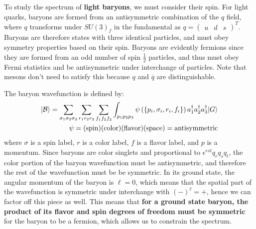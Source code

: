 \documentclass[11pt, oneside]{article}   	%
\theoremstyle{definition}
\numberwithin{equation}{subsection}		%
\begin{document}
To study the spectrum of \textbf{light baryons}, we must consider their spin. For light quarks, baryons are formed from an antisymmetric combination of 
the $q$ field, where $q$ transforms under $SU(3)_f$ in the fundamental as $q = \begin{pmatrix} u & d & s \end{pmatrix}^T$. Baryons are therefore 
states with three identical particles, and must obey symmetry properties based on their spin. Baryons are evidently fermions since they are 
formed from an odd number of spin $\frac{1}{2}$ particles, and thus must obey Fermi statistics and be antisymmetric under interchange of 
particles. Note that mesons don't need to satisfy this because $q$ and $\overline q$ are distinguishable. 

The baryon wavefunction is defined by:
\begin{align}
	|\mathcal B\rangle = \sum_{\sigma_1 \sigma_2\sigma_3} \sum_{r_1 r_2 r_3} \sum_{f_1 f_2 f_3} \int_{p_1 p_2 p_3} \psi\left(\{p_i, \sigma_i, r_i, f_i\}\right) 
	a_1^\dagger a_2^\dagger a_3^\dagger |G\rangle \\
	\psi = (\textnormal{spin})(\textnormal{color})(\textnormal{flavor})(\textnormal{space}) = \textnormal{antisymmetric}
\end{align}
where $\sigma$ is a spin label, $r$ is a color label, $f$ is a flavor label, and $p$ is a momentum. Since baryons are color singlets and proportional to 
$\epsilon^{rst} q_r q_s q_t$, the color portion of the baryon wavefunction must be antisymmetric, and therefore the rest of the wavefunction must be 
be symmetric. In its ground state, the angular momentum of the baryon is $\ell = 0$, which means that the spatial part of the wavefunction is symmetric 
under interchange with $(-)^\ell = +$, hence we can factor off this piece as well. This means that \textbf{for a ground state baryon, the product of its flavor 
and spin degrees of freedom must be symmetric} for the baryon to be a fermion, which allows us to constrain the spectrum. 
\end{document}
